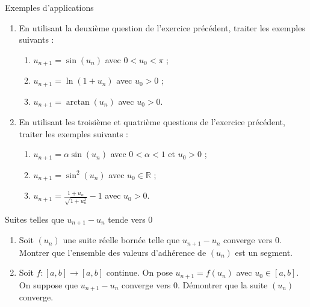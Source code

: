 \documentclass[french,a4paper]{article}
\newcommand{\R}{\mathbb{R}}
\theoremstyle{plain}
\theoremstyle{definition}
\theoremstyle{remark}
\begin{document}
\begin{ex}{Exemples d'applications}
	\begin{enumerate}
		\item En utilisant la deuxième question de l'exercice précédent, traiter les exemples suivants : 
		\begin{enumerate}[label=\alph*.]
			\item $u_{n+1}=\sin(u_n)$ avec $0<u_0<\pi$ ;
			\item $u_{n+1}=\ln(1+u_n)$ avec $u_0>0$ ;
			\item $u_{n+1}=\arctan(u_n)$ avec $u_0>0$.
		\end{enumerate}
		\item En utilisant les troisième et quatrième questions de l'exercice précédent, traiter les exemples suivants :
		\begin{enumerate}[label=\alph*.]
			\item $u_{n+1}=\alpha\sin(u_n)$ avec $0<\alpha<1$ et $u_{0}>0$ ;
			\item $u_{n+1}=\sin^2(u_n)$ avec $u_{0}\in\R$ ;
			\item $\displaystyle u_{n+1}=\frac{1+u_n}{\sqrt{1+u_n^2}}-1$ avec $u_{0}>0$.
		\end{enumerate}
	\end{enumerate}
\end{ex}
\begin{ex}{Suites telles que $u_{n+1}-u_n$ tende vers $0$}
	\begin{enumerate}
		\item Soit $(u_n)$ une suite réelle bornée telle que $u_{n+1}-u_n$ converge vers $0$. Montrer que l'ensemble des valeurs d'adhérence de $(u_n)$ est un segment.
		\item Soit $f:[a,b]\to[a,b]$ continue. On pose $u_{n+1}=f(u_n)$ avec $u_0\in[a,b]$. On suppose que $u_{n+1}-u_n$ converge vers $0$. Démontrer que la suite $(u_n)$ converge.
	\end{enumerate}
\end{ex}
\end{document}
